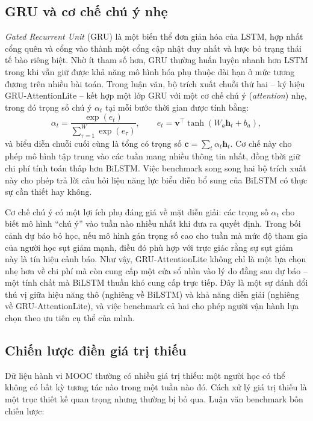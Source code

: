 \subsection{GRU và cơ chế chú ý nhẹ}

\textit{Gated Recurrent Unit} (GRU) là một biến thể đơn giản hóa của LSTM, hợp nhất cổng quên và cổng vào thành một cổng cập nhật duy nhất và lược bỏ trạng thái tế bào riêng biệt. Nhờ ít tham số hơn, GRU thường huấn luyện nhanh hơn LSTM trong khi vẫn giữ được khả năng mô hình hóa phụ thuộc dài hạn ở mức tương đương trên nhiều bài toán. Trong luận văn, bộ trích xuất chuỗi thứ hai -- ký hiệu GRU-AttentionLite -- kết hợp một lớp GRU với một cơ chế chú ý (\textit{attention}) nhẹ, trong đó trọng số chú ý $\alpha_t$ tại mỗi bước thời gian được tính bằng:
\begin{equation}
\alpha_t = \frac{\exp(e_t)}{\sum_{\tau=1}^{W} \exp(e_\tau)}, \qquad e_t = \mathbf{v}^\top \tanh(W_a \mathbf{h}_t + b_a),
\end{equation}
và biểu diễn chuỗi cuối cùng là tổng có trọng số $\mathbf{c} = \sum_t \alpha_t \mathbf{h}_t$. Cơ chế này cho phép mô hình tập trung vào các tuần mang nhiều thông tin nhất, đồng thời giữ chi phí tính toán thấp hơn BiLSTM. Việc benchmark song song hai bộ trích xuất này cho phép trả lời câu hỏi liệu năng lực biểu diễn bổ sung của BiLSTM có thực sự cần thiết hay không.

Cơ chế chú ý có một lợi ích phụ đáng giá về mặt diễn giải: các trọng số $\alpha_t$ cho biết mô hình ``chú ý'' vào tuần nào nhiều nhất khi đưa ra quyết định. Trong bối cảnh dự báo bỏ học, nếu mô hình gán trọng số cao cho tuần mà mức độ tham gia của người học sụt giảm mạnh, điều đó phù hợp với trực giác rằng sự sụt giảm này là tín hiệu cảnh báo. Như vậy, GRU-AttentionLite không chỉ là một lựa chọn nhẹ hơn về chi phí mà còn cung cấp một cửa sổ nhìn vào lý do đằng sau dự báo -- một tính chất mà BiLSTM thuần khó cung cấp trực tiếp. Đây là một sự đánh đổi thú vị giữa hiệu năng thô (nghiêng về BiLSTM) và khả năng diễn giải (nghiêng về GRU-AttentionLite), và việc benchmark cả hai cho phép người vận hành lựa chọn theo ưu tiên cụ thể của mình.

\subsection{Chiến lược điền giá trị thiếu}
\label{sec:dienthieu}

Dữ liệu hành vi MOOC thường có nhiều giá trị thiếu: một người học có thể không có bất kỳ tương tác nào trong một tuần nào đó. Cách xử lý giá trị thiếu là một trục thiết kế quan trọng nhưng thường bị bỏ qua. Luận văn benchmark bốn chiến lược:

